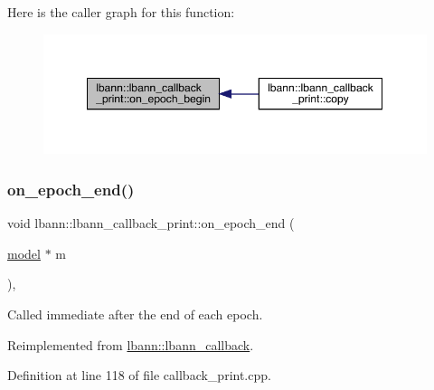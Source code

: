 Here is the caller graph for this function\+:\nopagebreak
\begin{figure}[H]
\begin{center}
\leavevmode
\includegraphics[width=349pt]{classlbann_1_1lbann__callback__print_ae3c99d7c56ac33ab7e09880134b43cad_icgraph}
\end{center}
\end{figure}
\mbox{\label{classlbann_1_1lbann__callback__print_a28f2b022193c62f3af40364d2c5b14b2}} 
\subsubsection{\texorpdfstring{on\+\_\+epoch\+\_\+end()}{on\_epoch\_end()}}
{\footnotesize\ttfamily void lbann\+::lbann\+\_\+callback\+\_\+print\+::on\+\_\+epoch\+\_\+end (\begin{DoxyParamCaption}\item[{\hyperlink{classlbann_1_1model}{model} $\ast$}]{m }\end{DoxyParamCaption})\hspace{0.3cm}{\ttfamily [override]}, {\ttfamily [virtual]}}

Called immediate after the end of each epoch. 

Reimplemented from \hyperlink{classlbann_1_1lbann__callback_a1fc71110e7f754bf73c9e0f344a448a5}{lbann\+::lbann\+\_\+callback}.



Definition at line 118 of file callback\+\_\+print.\+cpp.


